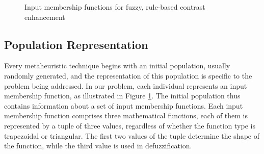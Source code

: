 \begin{figure}
    \centering
    \caption{Input membership functions for fuzzy, rule-based contrast enhancement  \cite{gonzalez2008digital}}
    \label{fig:fuzzy_function}
\end{figure}



\subsection{Population Representation}
\label{subsection:method_pop}
Every metaheuristic technique begins with an initial population, usually randomly generated, and the representation of this population is specific to the problem being addressed. 
In our problem, each individual represents an input membership function, as illustrated in Figure \ref{fig:fuzzy_function}. 
The initial population thus contains information about a set of input membership functions. 
Each input membership function comprises three mathematical functions, each of them is represented by a tuple of three values, regardless of whether the function type is trapezoidal or triangular. 
The first two values of the tuple determine the shape of the function, while the third value is used in defuzzification.

